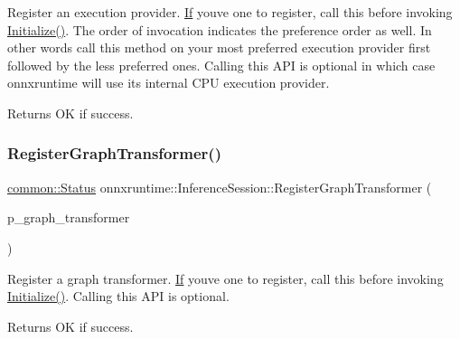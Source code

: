 Register an execution provider. \mbox{\hyperlink{classonnxruntime_1_1If}{If}} you\textquotesingle{}ve one to register, call this before invoking \mbox{\hyperlink{classonnxruntime_1_1InferenceSession_aef2b179e956c7450ccf22d0be3374b6e}{Initialize()}}. The order of invocation indicates the preference order as well. In other words call this method on your most preferred execution provider first followed by the less preferred ones. Calling this A\+PI is optional in which case onnxruntime will use its internal C\+PU execution provider. \begin{DoxyReturn}{Returns}
OK if success. 
\end{DoxyReturn}
\mbox{\label{classonnxruntime_1_1InferenceSession_a0aa67768d7e26977dae70be76a3f8200}} 
\subsubsection{\texorpdfstring{Register\+Graph\+Transformer()}{RegisterGraphTransformer()}}
{\footnotesize\ttfamily \mbox{\hyperlink{classonnxruntime_1_1common_1_1Status}{common\+::\+Status}} onnxruntime\+::\+Inference\+Session\+::\+Register\+Graph\+Transformer (\begin{DoxyParamCaption}\item[{std\+::unique\+\_\+ptr$<$ \mbox{\hyperlink{classonnxruntime_1_1GraphTransformer}{onnxruntime\+::\+Graph\+Transformer}} $>$}]{p\+\_\+graph\+\_\+transformer }\end{DoxyParamCaption})}

Register a graph transformer. \mbox{\hyperlink{classonnxruntime_1_1If}{If}} you\textquotesingle{}ve one to register, call this before invoking \mbox{\hyperlink{classonnxruntime_1_1InferenceSession_aef2b179e956c7450ccf22d0be3374b6e}{Initialize()}}. Calling this A\+PI is optional. \begin{DoxyReturn}{Returns}
OK if success. 
\end{DoxyReturn}
\mbox{\label{classonnxruntime_1_1InferenceSession_a90aa8b5fdc2638c4d2c45afc9c3ed222}} 
